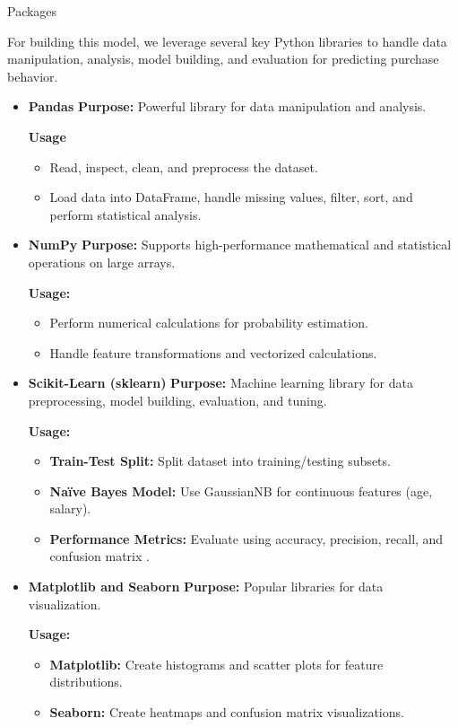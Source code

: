 \begin{frame}{Packages}

For building this model, we leverage several key Python libraries to handle data manipulation, analysis, model building, and evaluation for predicting purchase behavior.



\begin{itemize}
	\item \textbf{Pandas}
	\textbf{Purpose:} Powerful library for data manipulation and analysis.
	
	\textbf{Usage}
	\begin{itemize}
		\item Read, inspect, clean, and preprocess the dataset.
		\item Load data into DataFrame, handle missing values, filter, sort, and perform statistical analysis.
	\end{itemize}
	
	
	
	\item\textbf{NumPy}
	\textbf{Purpose:} Supports high-performance mathematical and statistical operations on large arrays.
	
	\textbf{Usage:}
	\begin{itemize}
		\item Perform numerical calculations for probability estimation.
		\item Handle feature transformations and vectorized calculations.
	\end{itemize}
\end{itemize}
\end{frame}

\begin{itemize}
	\item\textbf{Scikit-Learn (sklearn)}
	\textbf{Purpose:} Machine learning library for data preprocessing, model building, evaluation, and tuning.
	
	\textbf{Usage:}
	\begin{itemize}
		\item \textbf{Train-Test Split:} Split dataset into training/testing subsets.
		\item \textbf{Naïve Bayes Model:} Use GaussianNB for continuous features (age, salary).
		\item \textbf{Performance Metrics:} Evaluate using accuracy, precision, recall, and confusion matrix .
	\end{itemize}
	
	
	
	\item\textbf{Matplotlib and Seaborn}
	\textbf{Purpose:} Popular libraries for data visualization.
	
	\textbf{Usage:}
	\begin{itemize}
		\item \textbf{Matplotlib:} Create histograms and scatter plots for feature distributions.
		\item \textbf{Seaborn:} Create heatmaps and confusion matrix visualizations.
	\end{itemize}
\end{itemize}



